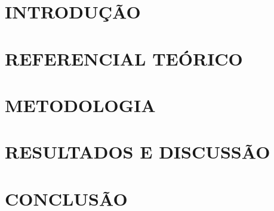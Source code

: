 \documentclass[a4paper, 12pt, twocolumn]{article}
\begin{document}
    

    \section{\MakeUppercase{Introdução}}
    

    \section{\MakeUppercase{Referencial Teórico}}
    

    \section{\MakeUppercase{Metodologia}} 
    

    \section{\MakeUppercase{Resultados e Discussão}}
    

    \section{\MakeUppercase{Conclusão}}
    

    
    
\end{document}
